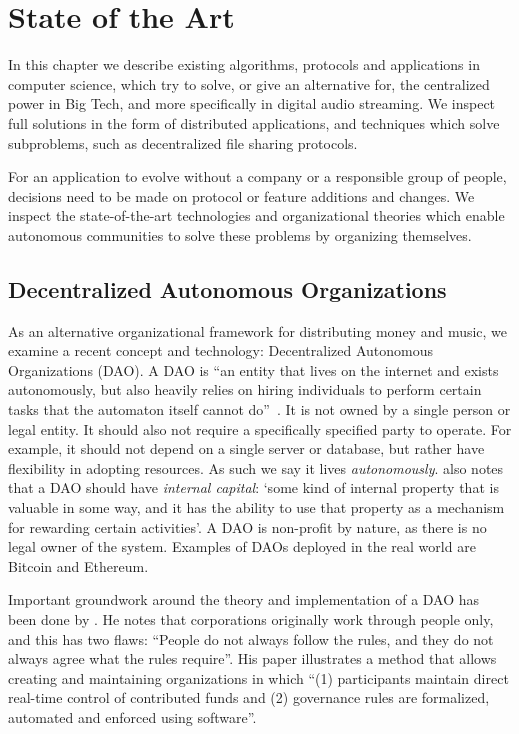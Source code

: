 \chapter{\label{chap:state-of-the-art}State of the Art}
In this chapter we describe existing algorithms, protocols and applications in computer science, which try to solve, or give an alternative for, the centralized power in Big Tech, and more specifically in digital audio streaming. We inspect full solutions in the form of distributed applications, and techniques which solve subproblems, such as decentralized file sharing protocols.

For an application to evolve without a company or a responsible group of people, decisions need to be made on protocol or feature additions and changes. We inspect the state-of-the-art technologies and organizational theories which enable autonomous communities to solve these problems by organizing themselves.

\section{Decentralized Autonomous Organizations}
As an alternative organizational framework for distributing money and music, we examine a recent concept and technology: Decentralized Autonomous Organizations (DAO).
A DAO is ``an entity that lives on the internet and exists autonomously, but also heavily relies on hiring individuals to perform certain tasks that the automaton itself cannot do''~\citep{buterin2014dao}. It is not owned by a single person or legal entity. It should also not require a specifically specified party to operate. For example, it should not depend on a single server or database, but rather have flexibility in adopting resources. As such we say it lives \textit{autonomously}. \cite{buterin2014dao} also notes that a DAO should have \textit{internal capital}: `some kind of internal property that is valuable in some way, and it has the ability to use that property as a mechanism for rewarding certain activities'. A DAO is non-profit by nature, as there is no legal owner of the system. Examples of DAOs deployed in the real world are Bitcoin and Ethereum.

Important groundwork around the theory and implementation of a DAO has been done by \cite{jentzsch2016decentralized}. He notes that corporations originally work through people only, and this has two flaws: ``People do not always follow the rules, and they do not always agree what the rules require''. His paper illustrates a method that allows creating and maintaining organizations in which ``(1) participants maintain direct real-time control of contributed funds and (2) governance rules are formalized, automated and enforced using software''.

